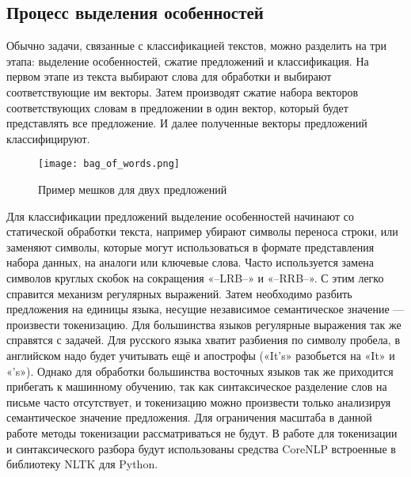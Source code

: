 \subsection{Процесс выделения особенностей}\label{subsec:overview:overview_feature_extraction}
Обычно задачи, связанные с классификацией текстов, можно разделить на три этапа: выделение особенностей, сжатие предложений и классификация. На первом этапе из текста выбирают слова для обработки и выбирают соответствующие им векторы. Затем производят сжатие набора векторов соответствующих словам в предложении в один вектор, который будет представлять все предложение. И далее полученные векторы предложений классифицируют\cite{Goodfellow-et-al-2016}.

\begin{figure}[h]
  \begin{center}
    \texttt{[image: bag\_of\_words.png]}
    \caption{Пример мешков для двух предложений\cite{Goodfellow-et-al-2016}}\label{fig:overview:bag_of_words}
  \end{center}
\end{figure}

Для классификации предложений выделение особенностей начинают со статической обработки текста, например убирают символы переноса строки, или заменяют символы, которые могут использоваться в формате представления набора данных, на аналоги или ключевые слова. Часто используется замена символов круглых скобок на сокращения «--LRB--» и «--RRB--». С этим легко справится механизм регулярных выражений. Затем необходимо разбить предложения на единицы языка, несущие независимое семантическое значение --- произвести токенизацию. Для большинства языков регулярные выражения так же справятся с задачей. Для русского языка хватит разбиения по символу пробела, в английском надо будет учитывать ещё и апострофы («It's» разобьется на «It» и «'s»). Однако для обработки большинства восточных языков так же приходится прибегать к машинному обучению, так как синтаксическое разделение слов на письме часто отсутствует, и токенизацию можно произвести только анализируя семантическое значение предложения. Для ограничения масштаба в данной работе методы токенизации рассматриваться не будут\cite{Goodfellow-et-al-2016}.
В работе для токенизации и синтаксического разбора будут использованы средства CoreNLP встроенные в библиотеку NLTK для Python.

